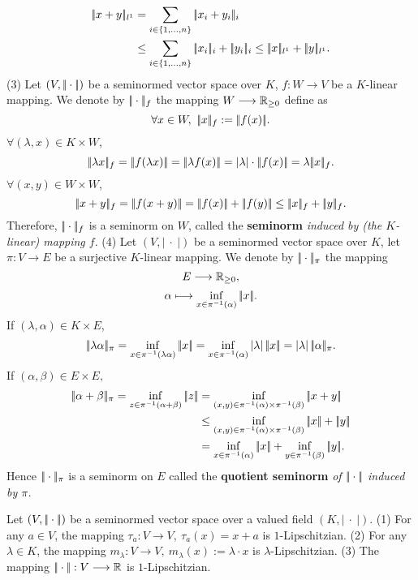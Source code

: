 \begin{exampleenv}
\begin{align*}
        \pl x+y\pl_{l^1}&=\sum_{i\in\{1,\dots,n\}}\pl x_i+y_i\pl_i\\
        &\le \sum_{i\in\{1,\dots,n\}}\pl x_i\pl_i+\pl y_i\pl_i\le \pl x\pl_{l^1}+\pl y\pl_{l^1}.
    \end{align*}
    (3) Let $(V,|\!|\cdot|\!|)$ be a seminormed vector space over $K$, $f:W\longrightarrow V$ be a $K$-linear mapping. We denote by $|\!|\cdot|\!|_f$ the mapping $W\longrightarrow \mathbb{R}_{\ge 0}$ define as 
    $$\forall x\in W, \ |\!| x|\!|_f:=|\!| f(x)|\!|.$$
    $\forall (\lambda,x)\in K\times W$, 
    $$\pl \lambda x\pl_f=\pl f(\lambda x)\pl =\pl \lambda f(x)\pl =\left|\lambda\right|\cdot\pl f(x)\pl=\lambda \pl x\pl_f.$$
    $\forall (x,y)\in W\times W$, 
    $$\pl x+y\pl_f=\pl f(x+y)\pl=\pl f(x)\pl+\pl f(y)\pl\le \pl x\pl_f+\pl y\pl_f.$$
    Therefore, $|\!|\cdot|\!|_f$ is a seminorm on $W$, called the \textbf{seminorm} \textit{induced by (the $K$-linear) mapping $f$}.
    \newline
    (4) Let $(V,\left|\ \cdot\ \right|)$ be a seminormed vector space over $K$, let $\pi:V\longrightarrow E$ be a surjective $K$-linear mapping. We denote by $|\!|\cdot|\!|_\pi$ the mapping
    $$E\longrightarrow \mathbb{R}_{\ge 0},$$
    $$\alpha\longmapsto \inf_{x\in \pi^{-1}(\alpha)}|\!| x|\!|.$$
    If $(\lambda,\alpha)\in K\times E$,
    $$\pl \lambda\alpha\pl_\pi=\inf_{x\in \pi^{-1}(\lambda\alpha)}\pl x \pl=\inf_{x\in \pi^{-1}(\alpha)}\left|\lambda\right|\pl x\pl=\left|\lambda\right|\pl\alpha\pl_\pi.$$
    If $(\alpha,\beta)\in E\times E,$
    \begin{align*}
         \pl\alpha+\beta\pl_\pi=\inf_{z\in\pi^{-1}(\alpha+\beta)}\pl z\pl &=\inf_{(x,y)\in \pi^{-1}(\alpha)\times\pi^{-1}(\beta)}\pl x+y\pl \\
         &\le\inf_{(x,y)\in \pi^{-1}(\alpha)\times\pi^{-1}(\beta)}\pl x\pl +\pl y\pl\\
         &=\inf_{x\in \pi^{-1}(\alpha)}\pl x\pl+\inf_{y\in \pi^{-1}(\beta)}\pl y\pl.
    \end{align*}
    Hence $|\!|\cdot|\!|_\pi$ is a seminorm on $E$ called the \textbf{quotient seminorm} \textit{of $|\!|\cdot|\!|$ induced by $\pi$.} 
\end{exampleenv}
\begin{propositionenv}
    Let $(V,|\!|\cdot|\!|)$ be a seminormed vector space over a valued field $(K,\left|\ \cdot\ \right|)$.
    \newline
    (1) For any $a\in V$, the mapping $\tau_a:V\longrightarrow V,\ \tau_a(x)=x+a$ is $1$-Lipschitzian.
    \newline
    (2) For any $\lambda\in K$, the mapping $m_\lambda:V\longrightarrow V,\ m_\lambda(x):=\lambda\cdot x$ is $\lambda$-Lipschitzian.
    \newline
    (3) The mapping $|\!|\cdot|\!|: V\longrightarrow \mathbb{R}$ is $1$-Lipschitzian.
\end{propositionenv}
